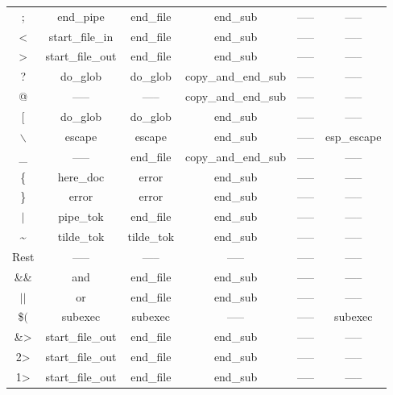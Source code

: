 \documentclass[12pt,a4paper]{report}
\begin{document}
\begin{table}[H]
\begin{tabular}{ |c|c|c|c|c|c| }
	; & end\_pipe & end\_file\cellcolor[HTML]{BEE9F9} &  end\_sub \cellcolor[HTML]{FFF49C}& ----- & ----- \\
	< & start\_file\_in \cellcolor[HTML]{BEE9F9}& end\_file\cellcolor[HTML]{BEE9F9}&  end\_sub \cellcolor[HTML]{FFF49C}& ----- & ----- \\
	> & start\_file\_out \cellcolor[HTML]{BEE9F9}& end\_file \cellcolor[HTML]{BEE9F9}&  end\_sub \cellcolor[HTML]{FFF49C}& ----- & ----- \\
	? & do\_glob & do\_glob & copy\_and\_end\_sub \cellcolor[HTML]{FFF49C}& ----- & ----- \\
	@ & ----- & ----- & copy\_and\_end\_sub \cellcolor[HTML]{FFF49C}& ----- & ----- \\
	$[$ & do\_glob & do\_glob &  end\_sub \cellcolor[HTML]{FFF49C}& ----- & ----- \\
	$\backslash$ & escape & escape &  end\_sub \cellcolor[HTML]{FFF49C}& ----- & esp\_escape \\
	\_ & ----- & end\_file \cellcolor[HTML]{BEE9F9}& copy\_and\_end\_sub \cellcolor[HTML]{FFF49C}& ----- & ----- \\
	\{ & here\_doc & error \cellcolor[HTML]{FF0044} &  end\_sub \cellcolor[HTML]{FFF49C}& ----- & ----- \\
	\} & error \cellcolor[HTML]{FF0044} & error \cellcolor[HTML]{FF0044} & end\_sub \cellcolor[HTML]{FFF49C} & ----- & ----- \\
	$|$ & pipe\_tok & end\_file\cellcolor[HTML]{BEE9F9} &  end\_sub \cellcolor[HTML]{FFF49C}& ----- & ----- \\
	\textasciitilde  & tilde\_tok \cellcolor[HTML]{FFF49C}& tilde\_tok \cellcolor[HTML]{FFF49C} &  end\_sub \cellcolor[HTML]{FFF49C}& ----- & ----- \\
	Rest  & ----- & ----- &  ----- & ----- & ----- \\
	\hline
	\&\&  & and & end\_file \cellcolor[HTML]{BEE9F9}&  end\_sub\cellcolor[HTML]{FFF49C} & ----- & ----- \\
	$||$  & or & end\_file\cellcolor[HTML]{BEE9F9} &  end\_sub \cellcolor[HTML]{FFF49C}& ----- & ----- \\
	\$$($  & subexec\cellcolor[HTML]{C500FF} & subexec\cellcolor[HTML]{C500FF} &  ----- & ----- & subexec\cellcolor[HTML]{C500FF} \\
	\&>  & start\_file\_out \cellcolor[HTML]{BEE9F9}& end\_file \cellcolor[HTML]{BEE9F9}&  end\_sub \cellcolor[HTML]{FFF49C}& ----- & ----- \\
	2>  & start\_file\_out \cellcolor[HTML]{BEE9F9}& end\_file \cellcolor[HTML]{BEE9F9}&  end\_sub \cellcolor[HTML]{FFF49C}& ----- & ----- \\
	1>  & start\_file\_out \cellcolor[HTML]{BEE9F9}& end\_file \cellcolor[HTML]{BEE9F9}&  end\_sub \cellcolor[HTML]{FFF49C}& ----- & ----- \\
	\hline
\end{tabular}
\end{table}
\end{document}
